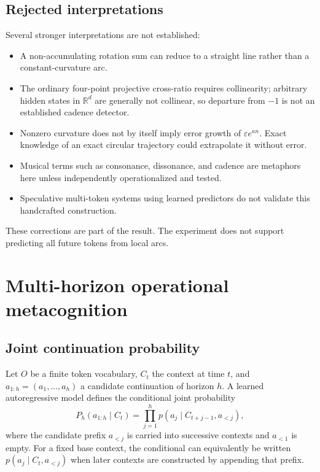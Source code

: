 \documentclass[11pt,a4paper]{article}
\begin{document}
\subsection{Rejected interpretations}
Several stronger interpretations are not established:
\begin{itemize}[nosep]
  \item A non-accumulating rotation sum can reduce to a straight line rather than a constant-curvature arc.
  \item The ordinary four-point projective cross-ratio requires collinearity; arbitrary hidden states in $\mathbb{R}^d$ are generally not collinear, so departure from $-1$ is not an established cadence detector.
  \item Nonzero curvature does not by itself imply error growth of $\varepsilon e^{\kappa n}$. Exact knowledge of an exact circular trajectory could extrapolate it without error.
  \item Musical terms such as consonance, dissonance, and cadence are metaphors here unless independently operationalized and tested.
  \item Speculative multi-token systems using learned predictors do not validate this handcrafted construction.
\end{itemize}
These corrections are part of the result. The experiment does not support predicting all future tokens from local arcs.

\section{Multi-horizon operational metacognition}
\subsection{Joint continuation probability}
Let $O$ be a finite token vocabulary, $C_t$ the context at time $t$, and $a_{1:h}=(a_1,\ldots,a_h)$ a candidate continuation of horizon $h$. A learned autoregressive model defines the conditional joint probability
\begin{equation}
P_h(a_{1:h}\mid C_t)=\prod_{j=1}^{h}p(a_j\mid C_{t+j-1},a_{<j}),
\label{eq:joint-continuation}
\end{equation}
where the candidate prefix $a_{<j}$ is carried into successive contexts and $a_{<1}$ is empty. For a fixed base context, the conditional can equivalently be written $p(a_j\mid C_t,a_{<j})$ when later contexts are constructed by appending that prefix.
\end{document}
